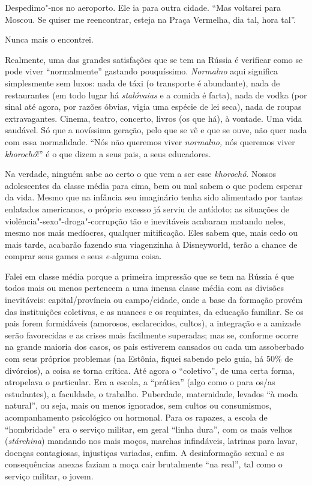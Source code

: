 Despedimo"-nos no aeroporto. Ele ia para outra cidade. ``Mas voltarei
para Moscou. Se quiser me reencontrar, esteja na Praça Vermelha, dia
tal, hora tal''.

Nunca mais o encontrei.

Realmente, uma das grandes satisfações que se tem na Rússia é verificar
como se pode viver ``normalmente'' gastando pouquíssimo. \emph{Normalno}
aqui significa simplesmente sem luxos: nada de táxi (o transporte é
abundante), nada de restaurantes (em todo lugar há \emph{stalóvaias} e a
comida é farta), nada de vodka (por sinal até agora, por razões óbvias,
vigia uma espécie de lei seca), nada de roupas extravagantes. Cinema,
teatro, concerto, livros (os que há), à vontade. Uma vida saudável. Só
que a novíssima geração, pelo que se vê e que se ouve, não quer nada com
essa normalidade. ``Nós não queremos viver \emph{normalno,} nós queremos
viver \emph{khorochó}!'' é o que dizem a seus pais, a seus educadores.

Na verdade, ninguém sabe ao certo o que vem a ser esse \emph{khorochó}.
Nossos adolescentes da classe média para cima, bem ou mal sabem o que
podem esperar da vida. Mesmo que na infância seu imaginário tenha sido
alimentado por tantas enlatados americanos, o próprio excesso já serviu
de antídoto: as situações de violência"-sexo"-droga"-corrupção tão e
inevitáveis acabaram matando neles, mesmo nos mais medíocres, qualquer
mitificação. Eles sabem que, mais cedo ou mais tarde, acabarão fazendo
sua viagenzinha à Disneyworld, terão a chance de comprar seus games e
seus \emph{e-}alguma coisa.

Falei em classe média porque a primeira impressão que se tem na Rússia é
que todos mais ou menos pertencem a uma imensa classe média com as
divisões inevitáveis: capital/província ou campo/cidade, onde a base da
formação provém das instituições coletivas, e as nuances e os requintes,
da educação familiar. Se os pais forem formidáveis (amorosos,
esclarecidos, cultos), a integração e a amizade serão favorecidas e as
crises mais facilmente superadas; mas se, conforme ocorre na grande
maioria dos casos, os pais estiverem cansados ou cada um assoberbado com
seus próprios problemas (na Estônia, fiquei sabendo pelo guia, há 50\%
de divórcios), a coisa se torna crítica. Até agora o ``coletivo'', de
uma certa forma, atropelava o particular. Era a escola, a ``prática''
(algo como o  para os/as estudantes), a faculdade, o trabalho.
Puberdade, maternidade, levados ``à moda natural'', ou seja, mais ou
menos ignorados, sem cultos ou consumismos, acompanhamento psicológico
ou hormonal. Para os rapazes, a escola de ``hombridade'' era o serviço
militar, em geral ``linha dura'', com os mais velhos (\emph{stárchina})
mandando nos mais moços, marchas infindáveis, latrinas para lavar,
doenças contagiosas, injustiças variadas, enfim. A desinformação sexual
e as consequências anexas faziam a moça cair brutalmente ``na real'',
tal como o serviço militar, o jovem.

